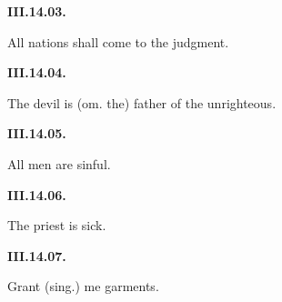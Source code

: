\par\begin{minipage}{\linewidth}\raggedright
\textbf{III.14.03.}

All nations shall come to the judgment.

\end{minipage}\par\addvspace{4pt}

\par\begin{minipage}{\linewidth}\raggedright
\textbf{III.14.04.}

The devil is (om. the) father of the unrighteous.

\end{minipage}\par\addvspace{4pt}

\par\begin{minipage}{\linewidth}\raggedright
\textbf{III.14.05.}

All men are sinful.

\end{minipage}\par\addvspace{4pt}

\par\begin{minipage}{\linewidth}\raggedright
\textbf{III.14.06.}

The priest is sick.

\end{minipage}\par\addvspace{4pt}

\par\begin{minipage}{\linewidth}\raggedright
\textbf{III.14.07.}

Grant (sing.) me garments.

\end{minipage}\par\addvspace{4pt}


